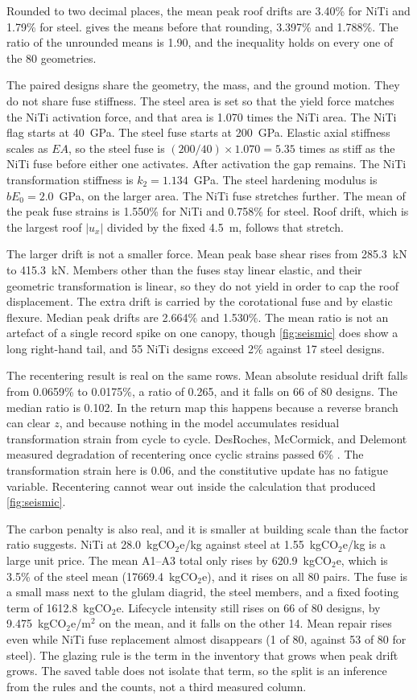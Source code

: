 \documentclass[10pt,a4paper]{article}
\begin{document}
Rounded to two decimal places, the mean peak roof drifts are 3.40\% for NiTi and 1.79\% for steel.  gives the means before that rounding, 3.397\% and 1.788\%. The ratio of the unrounded means is 1.90, and the inequality holds on every one of the 80 geometries.

The paired designs share the geometry, the mass, and the ground motion. They do not share fuse stiffness. The steel area is set so that the yield force matches the NiTi activation force, and that area is 1.070 times the NiTi area. The NiTi flag starts at 40~GPa. The steel fuse starts at 200~GPa. Elastic axial stiffness scales as $EA$, so the steel fuse is $(200/40)\times 1.070=5.35$ times as stiff as the NiTi fuse before either one activates. After activation the gap remains. The NiTi transformation stiffness is $k_2=1.134$~GPa. The steel hardening modulus is $b E_0=2.0$~GPa, on the larger area. The NiTi fuse stretches further. The mean of the peak fuse strains is 1.550\% for NiTi and 0.758\% for steel. Roof drift, which is the largest roof $|u_x|$ divided by the fixed 4.5~m, follows that stretch.

The larger drift is not a smaller force. Mean peak base shear rises from 285.3~kN to 415.3~kN. Members other than the fuses stay linear elastic, and their geometric transformation is linear, so they do not yield in order to cap the roof displacement. The extra drift is carried by the corotational fuse and by elastic flexure. Median peak drifts are 2.664\% and 1.530\%. The mean ratio is not an artefact of a single record spike on one canopy, though \cref{fig:seismic} does show a long right-hand tail, and 55 NiTi designs exceed 2\% against 17 steel designs.

The recentering result is real on the same rows. Mean absolute residual drift falls from 0.0659\% to 0.0175\%, a ratio of 0.265, and it falls on 66 of 80 designs. The median ratio is 0.102. In the return map this happens because a reverse branch can clear $z$, and because nothing in the model accumulates residual transformation strain from cycle to cycle. DesRoches, McCormick, and Delemont measured degradation of recentering once cyclic strains passed 6\% \cite{desroches2004}. The transformation strain here is 0.06, and the constitutive update has no fatigue variable. Recentering cannot wear out inside the calculation that produced \cref{fig:seismic}.

The carbon penalty is also real, and it is smaller at building scale than the factor ratio suggests. NiTi at 28.0~kgCO$_2$e/kg against steel at 1.55~kgCO$_2$e/kg is a large unit price. The mean A1--A3 total only rises by 620.9~kgCO$_2$e, which is 3.5\% of the steel mean (17669.4~kgCO$_2$e), and it rises on all 80 pairs. The fuse is a small mass next to the glulam diagrid, the steel members, and a fixed footing term of 1612.8~kgCO$_2$e. Lifecycle intensity still rises on 66 of 80 designs, by 9.475~kgCO$_2$e/m$^2$ on the mean, and it falls on the other 14. Mean repair rises even while NiTi fuse replacement almost disappears (1 of 80, against 53 of 80 for steel). The glazing rule is the term in the inventory that grows when peak drift grows. The saved table does not isolate that term, so the split is an inference from the rules and the counts, not a third measured column.
\end{document}
